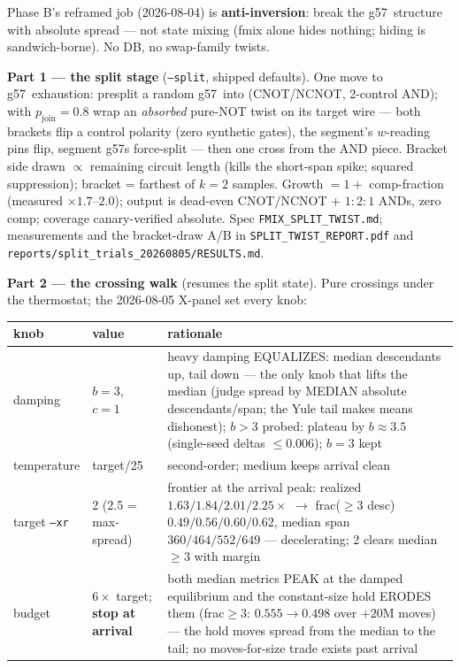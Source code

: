 \documentclass[11pt]{article}
\newcommand{\g}{\textsf{g57}}
\newcommand{\doc}[1]{\texttt{#1}}
\begin{document}
Phase B's reframed job (2026-08-04) is \textbf{anti-inversion}: break the
\g\ structure with absolute spread --- not state mixing (fmix alone hides
nothing; hiding is sandwich-borne). No DB, no swap-family twists.

\textbf{Part 1 --- the split stage} (\texttt{--split}, shipped defaults).
One move to \g\ exhaustion: presplit a random \g\ into (CNOT/NCNOT,
2-control AND); with $p_{\mathrm{join}}=0.8$ wrap an \emph{absorbed}
pure-NOT twist on its target wire --- both brackets flip a control
polarity (zero synthetic gates), the segment's $w$-reading pins flip,
segment \g s force-split --- then one cross from the AND piece. Bracket
side drawn $\propto$ remaining circuit length (kills the short-span spike;
squared suppression); bracket = farthest of $k{=}2$ samples. Growth
$= 1+$ comp-fraction (measured $\times1.7$--$2.0$); output is dead-even
CNOT/NCNOT + $1{:}2{:}1$ ANDs, zero comp; coverage canary-verified
absolute. Spec \doc{FMIX\_SPLIT\_TWIST.md}; measurements and the
bracket-draw A/B in \doc{SPLIT\_TWIST\_REPORT.pdf} and
\doc{reports/split\_trials\_20260805/RESULTS.md}.

\textbf{Part 2 --- the crossing walk} (resumes the split state). Pure
crossings under the thermostat; the 2026-08-05 X-panel set every knob:

\begin{table}[H]\small
\begin{tabular}{L{3.0cm} L{3.4cm} L{8.2cm}}
\toprule
knob & value & rationale \\
\midrule
damping & $b=3$, $c=1$ & heavy damping EQUALIZES: median descendants up, tail down --- the only knob that lifts the median (judge spread by MEDIAN absolute descendants/span; the Yule tail makes means dishonest); $b>3$ probed: plateau by $b\approx3.5$ (single-seed deltas $\le0.006$); $b=3$ kept \\
temperature & target/25 & second-order; medium keeps arrival clean \\
target \texttt{--xr} & 2 (2.5 = max-spread) & frontier at the arrival peak: realized $1.63/1.84/2.01/2.25\times$ $\rightarrow$ frac($\ge$3 desc) $0.49/0.56/0.60/0.62$, median span $360/464/552/649$ --- decelerating; 2 clears median $\ge 3$ with margin \\
budget & $6\times$ target; \textbf{stop at arrival} & both median metrics PEAK at the damped equilibrium and the constant-size hold ERODES them (frac$\ge$3: $0.555\to0.498$ over $+20$M moves) --- the hold moves spread from the median to the tail; no moves-for-size trade exists past arrival \\
\bottomrule
\end{tabular}
\end{table}
\end{document}
